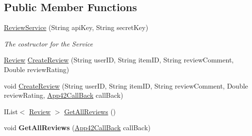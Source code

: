 \subsection*{Public Member Functions}
\begin{DoxyCompactItemize}
\item 
\hyperlink{classcom_1_1shephertz_1_1app42_1_1paas_1_1sdk_1_1csharp_1_1review_1_1_review_service_ac26659180ed5a8ae645fe7f8ead366ed}{Review\+Service} (String api\+Key, String secret\+Key)
\begin{DoxyCompactList}\small\item\em The costructor for the Service \end{DoxyCompactList}\item 
\hyperlink{classcom_1_1shephertz_1_1app42_1_1paas_1_1sdk_1_1csharp_1_1review_1_1_review}{Review} \hyperlink{classcom_1_1shephertz_1_1app42_1_1paas_1_1sdk_1_1csharp_1_1review_1_1_review_service_a941d9c7a9ccc50dfa51211f0d68611f3}{Create\+Review} (String user\+I\+D, String item\+I\+D, String review\+Comment, Double review\+Rating)
\item 
void \hyperlink{classcom_1_1shephertz_1_1app42_1_1paas_1_1sdk_1_1csharp_1_1review_1_1_review_service_a7b4c0f9f0b2466ce85998525466496c4}{Create\+Review} (String user\+I\+D, String item\+I\+D, String review\+Comment, Double review\+Rating, \hyperlink{interfacecom_1_1shephertz_1_1app42_1_1paas_1_1sdk_1_1csharp_1_1_app42_call_back}{App42\+Call\+Back} call\+Back)
\item 
I\+List$<$ \hyperlink{classcom_1_1shephertz_1_1app42_1_1paas_1_1sdk_1_1csharp_1_1review_1_1_review}{Review} $>$ \hyperlink{classcom_1_1shephertz_1_1app42_1_1paas_1_1sdk_1_1csharp_1_1review_1_1_review_service_a11b73454e19c810bf898e354670e45f8}{Get\+All\+Reviews} ()
\item 
\hypertarget{classcom_1_1shephertz_1_1app42_1_1paas_1_1sdk_1_1csharp_1_1review_1_1_review_service_ae4463884f0956752f8dbcf08eb0b1dbd}{void {\bfseries Get\+All\+Reviews} (\hyperlink{interfacecom_1_1shephertz_1_1app42_1_1paas_1_1sdk_1_1csharp_1_1_app42_call_back}{App42\+Call\+Back} call\+Back)}\label{classcom_1_1shephertz_1_1app42_1_1paas_1_1sdk_1_1csharp_1_1review_1_1_review_service_ae4463884f0956752f8dbcf08eb0b1dbd}


\end{DoxyCompactItemize}

